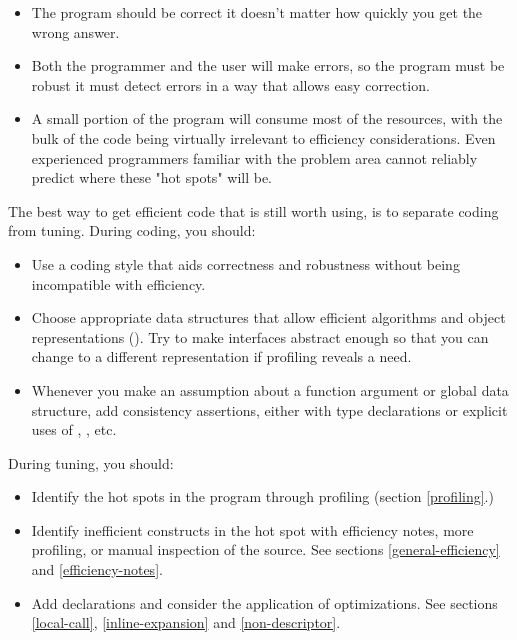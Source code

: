 {\begin{itemize}
\item
The program should be correct \dash{} it doesn't matter how quickly you get the
wrong answer.

\item
Both the programmer and the user will make errors, so the program must be
robust \dash{} it must detect errors in a way that allows easy correction.

\item
A small portion of the program will consume most of the resources, with the
bulk of the code being virtually irrelevant to efficiency considerations.  Even
experienced programmers familiar with the problem area cannot reliably predict
where these "hot spots" will be.
\end{itemize}



The best way to get efficient code that is still worth using, is to separate
coding from tuning.  During coding, you should:
\begin{itemize}

\item
Use a coding style that aids correctness and robustness without being
incompatible with efficiency.

\item
Choose appropriate data structures that allow efficient algorithms and object
representations ().  Try to make
interfaces abstract enough so that you can change to a different representation
if profiling reveals a need.

\item
Whenever you make an assumption about a function argument or global data
structure, add consistency assertions, either with type declarations or
explicit uses of , , etc.
\end{itemize}

During tuning, you should:
\begin{itemize}

\item
Identify the hot spots in the program through profiling (section
\ref{profiling}.)

\item
Identify inefficient constructs in the hot spot with efficiency notes, more
profiling, or manual inspection of the source.  See sections
\ref{general-efficiency} and \ref{efficiency-notes}.

\item
Add declarations and consider the application of optimizations.  See sections
\ref{local-call}, \ref{inline-expansion} and \ref{non-descriptor}.


\end{itemize}}
